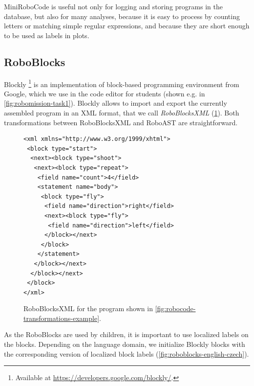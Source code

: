 MiniRoboCode is useful not only for logging and storing programs in the database,
but also for many analyses, because it is easy to process by counting
letters or matching simple regular expressions, and because they are short
enough to be used as labels in plots.


\subsection{RoboBlocks}

Blockly%
\footnote{Available at \url{https://developers.google.com/blockly/}.}
is an implementation of block-based programming
environment from Google,
which we use in the code editor for students
(shown e.g. in \cref{fig:robomission-task1}).
Blockly allows to import and export the currently assembled program in
an XML format, that we call \emph{RoboBlocksXML}
(\cref{fig:roboblocks-xml}).
Both transformations between RoboBlocksXML and RoboAST are straightforward.


\begin{figure}[h]
\begin{lstlisting}[basicstyle=\small\ttfamily]
<xml xmlns="http://www.w3.org/1999/xhtml">
 <block type="start">
  <next><block type="shoot">
   <next><block type="repeat">
    <field name="count">4</field>
    <statement name="body">
     <block type="fly">
      <field name="direction">right</field>
      <next><block type="fly">
       <field name="direction">left</field>
      </block></next>
     </block>
    </statement>
   </block></next>
  </block></next>
 </block>
</xml>
\end{lstlisting}
  \caption{%
    RoboBlocksXML for the program shown in %
    \cref{fig:robocode-transformations-example}.}
\label{fig:roboblocks-xml}
\end{figure}

As the RoboBlocks are used by children, it is important to use localized labels
on the blocks.
Depending on the language domain, we initialize Blockly blocks with the corresponding
version of localized block labels
(\cref{fig:roboblocks-english-czech}).

